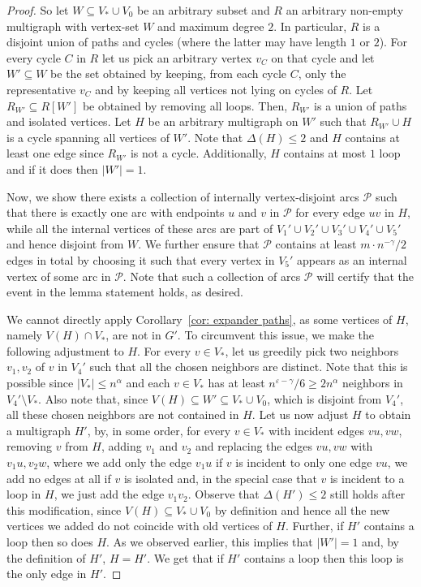 \documentclass[11pt,reqno]{article}
\begin{document}
\begin{proof}
     
     So let $W\subseteq V_*\cup V_0$ be an arbitrary subset and $R$ an arbitrary non-empty multigraph with vertex-set $W$ and maximum degree $2$. In particular, $R$ is a disjoint union of paths and cycles (where the latter may have length $1$ or $2$). For every cycle $C$ in $R$ let us pick an arbitrary vertex $v_C$ on that cycle and let $W'\subseteq W$ be the set obtained by keeping, from each cycle $C$, only the representative $v_C$ and by keeping all vertices not lying on cycles of $R$. Let $R_{W'}\subseteq R[W']$ be obtained by removing all loops. Then, $R_{W'}$ is a union of paths and isolated vertices. Let $H$ be an arbitrary multigraph on $W'$ such that $R_{W'}\cup H$ is a cycle spanning all vertices of $W'$. Note that $\Delta(H)\leq 2$ and $H$ contains at least one edge since $R_{W'}$ is not a cycle. 
     Additionally, $H$ contains at most $1$ loop and if it does then $|W'|=1$.

     Now, we show there exists a collection of internally vertex-disjoint arcs $\mathcal P$ such that there is exactly one arc with endpoints $u$ and $v$ in $\mathcal P$ for every edge $uv$ in $H$, while all the internal vertices of these arcs are part of $V_1'\cup V_2'\cup V_3'\cup V_4'\cup V_5'$ and hence disjoint from $W$. We further ensure that $\mathcal P$ contains at least $m\cdot n^{-\gamma}/2$ edges in total by choosing it such that every vertex in $V_5'$ appears as an internal vertex of some arc in $\mathcal{P}$. Note that such a collection of arcs $\mathcal P$ will certify that the event in the lemma statement holds, as desired.

     We cannot directly apply Corollary~\ref{cor: expander paths}, as some vertices of $H$, namely $V(H)\cap V_*$, are not in $G'$. To circumvent this issue, we make the following adjustment to $H$. For every $v\in V_*$, let us greedily pick two neighbors $v_1,v_2$ of $v$ in $V_4'$ such that all the chosen neighbors are distinct. Note that this is possible since $|V_*|\leq n^\alpha$ and each $v\in V_*$ has at least $n^{\varepsilon-\gamma}/6\geq 2n^\alpha$ neighbors in $V_4'\setminus V_*$. Also note that, since $V(H)\subseteq W'\subseteq V_\ast\cup V_0$, which is disjoint from $V_4'$, all these chosen neighbors are not contained in $H$. Let us now adjust $H$ to obtain a multigraph $H'$, by, in some order, for every $v\in V_*$ with incident edges $vu,vw$, removing $v$ from $H$, adding $v_1$ and $v_2$ and replacing the edges $vu,vw$ with $v_1u,v_2w$, where we add only the edge $v_1u$ if $v$ is incident to only one edge $vu$, we add no edges at all if $v$ is isolated and, in the special case that $v$ is incident to a loop in $H$, we just add the edge $v_1v_2$. Observe that $\Delta(H')\le 2$ still holds after this modification, since $V(H)\subseteq V_*\cup V_0$ by definition and hence all the new vertices we added do not coincide with old vertices of $H$. 
     Further, if $H'$ contains a loop then so does $H$. As we observed earlier, this implies that $|W'|=1$ and, by the definition of $H'$, $H=H'$. We get that if $H'$ contains a loop then this loop is the only edge in $H'$.


\end{proof}
\end{document}
